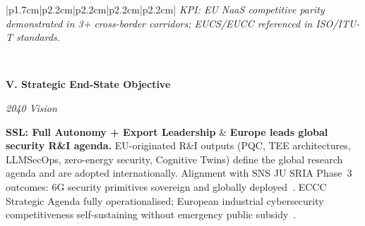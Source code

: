 \begin{longtable}{|p{1.7cm}|p{2.2cm}|p{2.2cm}|p{2.2cm}|p{2.2cm}|}
\smallskip
\textit{KPI: EU NaaS competitive parity demonstrated in 3+ cross-border
corridors; EUCS/EUCC referenced in ISO/ITU-T standards.}
\\
\hline

\\
\hline

\textbf{V. Strategic End-State Objective}

\smallskip
\textit{2040 Vision}

\smallskip
\colorbox{sslpurple}{\footnotesize\textbf{SSL: Full Autonomy + Export Leadership}}
&
\footnotesize
\textbf{Europe leads global security R\&I agenda.}
EU-originated R\&I outputs (PQC, TEE architectures, LLMSecOps,
zero-energy security, Cognitive Twins) define the global research
agenda and are adopted internationally. Alignment with SNS JU SRIA
Phase~3 outcomes: 6G security primitives sovereign and globally
deployed~\cite{snsju}. ECCC Strategic Agenda fully operationalised;
European industrial cybersecurity competitiveness self-sustaining
without emergency public subsidy~\cite{eccc}.


\end{longtable}
